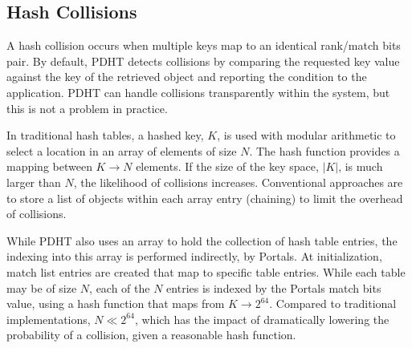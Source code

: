 \subsection{Hash Collisions} 

A hash collision occurs when multiple keys map to an identical rank/match bits
pair. By default, PDHT detects collisions by comparing the requested key value
against the key of the retrieved object and reporting the condition to the
application. PDHT can handle collisions transparently within the system, but
this is not a problem in practice.

In traditional hash tables, a hashed key, $K$, is used with modular arithmetic
to select a location in an array of elements of size $N$. The hash function
provides a mapping between $K \rightarrow N$ elements.  If the size of the key
space, $|K|$, is much larger than $N$, the likelihood of collisions increases.
Conventional approaches are to store a list of objects within each array entry
(chaining) to limit the overhead of collisions.

While PDHT also uses an array to hold the collection of hash table entries, the
indexing into this array is performed indirectly, by Portals. At
initialization, match list entries are created that map to specific table
entries. While each table may be of size $N$, each of the $N$ entries is
indexed by the Portals match bits value, using a hash function that maps from
$K \rightarrow 2^{64}$. Compared to traditional implementations, $N \ll
2^{64}$, which has the impact of dramatically lowering the probability of a
collision, given a reasonable hash function.








